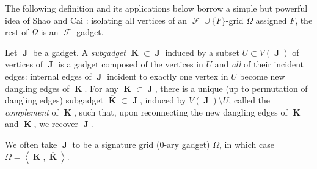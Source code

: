 \documentclass{theoretics}
\DeclareMathOperator{\vk}{\mathbf{K}}
\DeclareMathOperator{\vj}{\mathbf{J}}
\DeclareMathOperator{\fc}{\mathcal{F}}
\begin{document}
The following definition and its applications below borrow a simple but powerful idea of Shao and
Cai \cite[Section 8.2]{shao}: isolating all vertices of an
$\fc \cup \{F\}$-grid $\Omega$ assigned $F$, the rest of $\Omega$ is an $\fc$-gadget. 
\begin{definition}[Subgadget, $\overline{\vk}$]
    Let $\vj$ be a gadget. A \emph{subgadget} $\vk \subset \vj$ induced by a subset $U \subset V(\vj)$ 
    of vertices of $\vj$ is a gadget composed of the vertices in $U$ and 
    \emph{all} of their incident edges: internal edges of $\vj$ incident to 
    exactly one vertex in $U$ become new dangling edges of $\vk$.
    For any $\vk \subset \vj$, there is a
    unique (up to permutation of dangling edges) subgadget
    $\overline{\vk} \subset\vj$, induced by $V(\vj) \setminus U$, called the 
    \emph{complement} of $\vk$, such that, upon reconnecting the new dangling edges of $\vk$ and
    $\overline{\vk}$, we recover $\vj$.

    We often take $\vj$ to be a signature grid (0-ary gadget) $\Omega$, in which case
    $\Omega = \left\langle \vk,\overline{\vk} \right\rangle$.
\end{definition}
\end{document}
